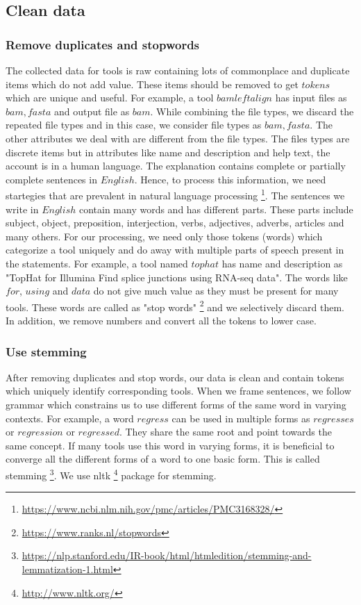 \subsection{Clean data}
\subsubsection{Remove duplicates and stopwords}
    The collected data for tools is raw containing lots of commonplace and duplicate items which do not add value. These items should be removed to get $tokens$ which are unique and useful. For example, a tool $bamleftalign$ has input files as $bam, fasta$ and output file as $bam$. While combining the file types, we discard the repeated file types and in this case, we consider file types as $bam, fasta$. The other attributes we deal with are different from the file types. The files types are discrete items but in attributes like name and description and help text, the account is in a human language. The explanation contains complete or partially complete sentences in $English$. Hence, to process this information, we need startegies that are prevalent in natural language processing \footnote{\url{https://www.ncbi.nlm.nih.gov/pmc/articles/PMC3168328/}}. The sentences we write in $English$ contain many words and has different parts. These parts include subject, object, preposition, interjection, verbs, adjectives, adverbs, articles and many others. For our processing, we need only those tokens (words) which categorize a tool uniquely and do away with multiple parts of speech present in the statements. For example, a tool named $tophat$ has name and description as "TopHat for Illumina Find splice junctions using RNA-seq data". The words like $for$, $using$ and $data$ do not give much value as they must be present for many tools. These words are called as "stop words" \footnote{\url{https://www.ranks.nl/stopwords}} and we selectively discard them. In addition, we remove numbers and convert all the tokens to lower case.
   
\subsubsection{Use stemming}
After removing duplicates and stop words, our data is clean and contain tokens which uniquely identify corresponding tools. When we frame sentences, we follow grammar which constrains us to use different forms of the same word in varying contexts. For example, a word $regress$ can be used in multiple forms as $regresses$ or $regression$ or $regressed$. They share the same root and point towards the same concept. If many tools use this word in varying forms, it is beneficial to converge all the different forms of a word to one basic form. This is called stemming \footnote{\url{https://nlp.stanford.edu/IR-book/html/htmledition/stemming-and-lemmatization-1.html}}. We use nltk \footnote{\url{http://www.nltk.org/}} package for stemming.

